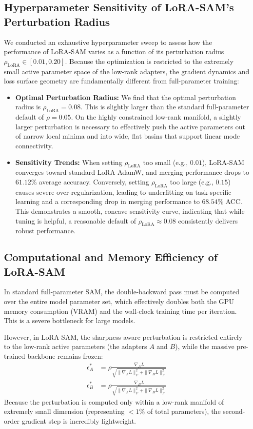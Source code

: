 \subsection{Hyperparameter Sensitivity of LoRA-SAM's Perturbation Radius}
We conducted an exhaustive hyperparameter sweep to assess how the performance of LoRA-SAM varies as a function of its perturbation radius $\rho_{\text{LoRA}} \in [0.01, 0.20]$. Because the optimization is restricted to the extremely small active parameter space of the low-rank adapters, the gradient dynamics and loss surface geometry are fundamentally different from full-parameter training:
\begin{itemize}
  \item \textbf{Optimal Perturbation Radius:} We find that the optimal perturbation radius is $\rho_{\text{LoRA}} = 0.08$. This is slightly larger than the standard full-parameter default of $\rho = 0.05$. On the highly constrained low-rank manifold, a slightly larger perturbation is necessary to effectively push the active parameters out of narrow local minima and into wide, flat basins that support linear mode connectivity.
  \item \textbf{Sensitivity Trends:} When setting $\rho_{\text{LoRA}}$ too small (e.g., $0.01$), LoRA-SAM converges toward standard LoRA-AdamW, and merging performance drops to $61.12\%$ average accuracy. Conversely, setting $\rho_{\text{LoRA}}$ too large (e.g., $0.15$) causes severe over-regularization, leading to underfitting on task-specific learning and a corresponding drop in merging performance to $68.54\%$ ACC. This demonstrates a smooth, concave sensitivity curve, indicating that while tuning is helpful, a reasonable default of $\rho_{\text{LoRA}} \approx 0.08$ consistently delivers robust performance.
\end{itemize}

\subsection{Computational and Memory Efficiency of LoRA-SAM}
In standard full-parameter SAM, the double-backward pass must be computed over the entire model parameter set, which effectively doubles both the GPU memory consumption (VRAM) and the wall-clock training time per iteration. This is a severe bottleneck for large models.

However, in LoRA-SAM, the sharpness-aware perturbation is restricted entirely to the low-rank active parameters (the adapters $A$ and $B$), while the massive pre-trained backbone remains frozen:
\begin{align}
  \epsilon^*_A &= \rho \frac{\nabla_A L}{\sqrt{\|\nabla_A L\|_F^2 + \|\nabla_B L\|_F^2}} \nonumber \\
  \epsilon^*_B &= \rho \frac{\nabla_B L}{\sqrt{\|\nabla_A L\|_F^2 + \|\nabla_B L\|_F^2}}
\end{align}
Because the perturbation is computed only within a low-rank manifold of extremely small dimension (representing $<1\%$ of total parameters), the second-order gradient step is incredibly lightweight.

